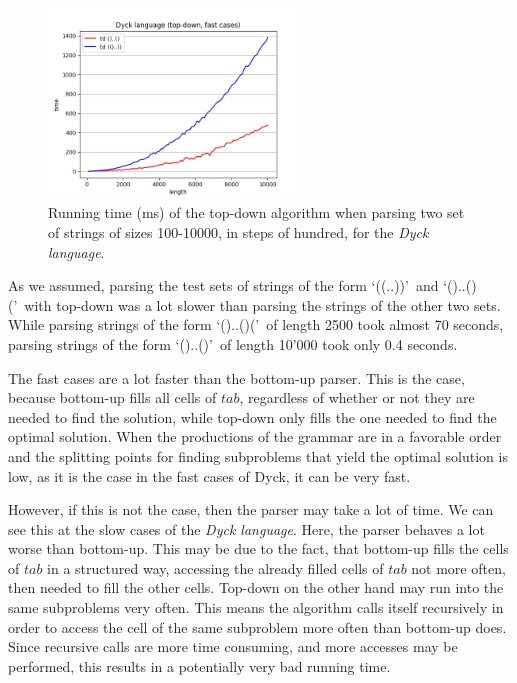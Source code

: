 \begin{figure}[h!]
    \centering
    \includegraphics[width=0.6\textwidth]{Resources/t_dyck_td_fast.jpg}
    \caption{Running time (ms) of the top-down algorithm when parsing two set of strings of sizes 100-10000, in steps of hundred, for the \textit{Dyck language}.}
    \label{fig:t_dyck_td_fast}
\end{figure}

As we assumed, parsing the test sets of strings of the form \lq((..))\rq~and \lq()..()(\rq~with top-down was a lot slower than parsing the strings of the other two sets.
While parsing strings of the form \lq()..()(\rq~of length 2500 took almost 70 seconds, parsing strings of the form \lq()..()\rq~of length 10'000 took only 0.4 seconds.

The fast cases are a lot faster than the bottom-up parser.
This is the case, because bottom-up fills all cells of $tab$, regardless of whether or not they are needed to find the solution, while top-down only fills the one needed to find the optimal solution.
When the productions of the grammar are in a favorable order and the splitting points for finding subproblems that yield the optimal solution is low, as it is the case in the fast cases of Dyck, it can be very fast.

However, if this is not the case, then the parser may take a lot of time.
We can see this at the slow cases of the \textit{Dyck language}.
Here, the parser behaves a lot worse than bottom-up.
This may be due to the fact, that bottom-up fills the cells of $tab$ in a structured way, accessing the already filled cells of $tab$ not more often, then needed to fill the other cells.
Top-down on the other hand may run into the same subproblems very often.
This means the algorithm calls itself recursively in order to access the cell of the same subproblem more often than bottom-up does.
Since recursive calls are more time consuming, and more accesses may be performed, this results in a potentially very bad running time.

